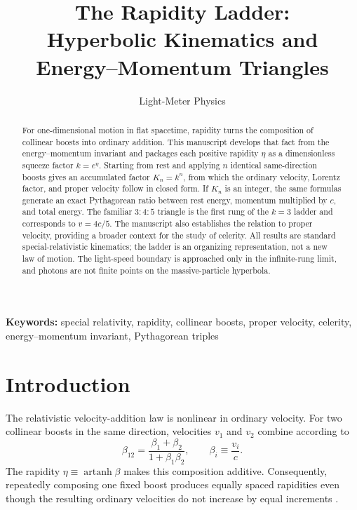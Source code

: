 \documentclass[12pt]{article}
\title{The Rapidity Ladder:\\
Hyperbolic Kinematics and Energy--Momentum Triangles}
\author{Light-Meter Physics}
\date{}
\begin{document}
\maketitle

\begin{abstract}
For one-dimensional motion in flat spacetime, rapidity turns the composition of collinear boosts into ordinary addition. This manuscript develops that fact from the energy--momentum invariant and packages each positive rapidity $\eta$ as a dimensionless squeeze factor $k=e^\eta$. Starting from rest and applying $n$ identical same-direction boosts gives an accumulated factor $K_n=k^n$, from which the ordinary velocity, Lorentz factor, and proper velocity follow in closed form. If $K_n$ is an integer, the same formulas generate an exact Pythagorean ratio between rest energy, momentum multiplied by $c$, and total energy. The familiar $3{:}4{:}5$ triangle is the first rung of the $k=3$ ladder and corresponds to $v=4c/5$. The manuscript also establishes the relation to proper velocity, providing a broader context for the study of celerity. All results are standard special-relativistic kinematics; the ladder is an organizing representation, not a new law of motion. The light-speed boundary is approached only in the infinite-rung limit, and photons are not finite points on the massive-particle hyperbola.
\end{abstract}

\noindent\textbf{Keywords:} special relativity, rapidity, collinear boosts, proper velocity, celerity, energy--momentum invariant, Pythagorean triples

\section{Introduction}

The relativistic velocity-addition law is nonlinear in ordinary velocity. For two collinear boosts in the same direction, velocities $v_1$ and $v_2$ combine according to
\begin{equation}
  \beta_{12}=\frac{\beta_1+\beta_2}{1+\beta_1\beta_2},
  \qquad \beta_i\equiv\frac{v_i}{c}.
  \label{eq:velocity-addition-intro}
\end{equation}
The rapidity $\eta\equiv\operatorname{artanh}\beta$ makes this composition additive. Consequently, repeatedly composing one fixed boost produces equally spaced rapidities even though the resulting ordinary velocities do not increase by equal increments \cite{Tong,Dray}.
\end{document}
